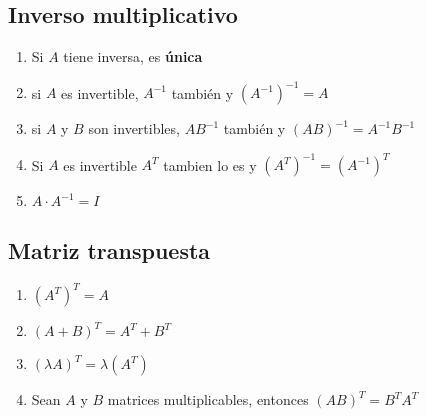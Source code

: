 \documentclass[]{article}
\begin{document}
\subsection{Inverso multiplicativo}
\begin{enumerate}
	\item Si $A$ tiene inversa, es \textbf{única}
	\item si $A$ es invertible, $A^{-1}$ también y $(A^{-1})^{-1}=A$
	\item si $A$ y $B$ son invertibles, $AB^{-1}$ también y $(AB)^{-1}=A^{-1}B^{-1}$
	\item Si $A$ es invertible $A^{T}$ tambien lo es y $(A^{T})^{-1}=(A^{-1})^{T}$
	\item $A \cdot A^{-1}=I$
\end{enumerate}

\subsection{Matriz transpuesta}
\begin{enumerate}
	\item $(A^{T})^{T}=A$
	\item $(A+B)^{T}=A^{T}+B^{T}$
	\item $(\lambda A)^{T}= \lambda (A^{T})$
	\item Sean $A$ y $B$ matrices multiplicables, entonces $(AB)^{T}=B^{T}A^{T}$
\end{enumerate}
\end{document}
